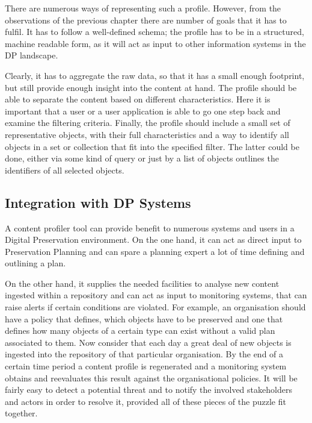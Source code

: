 There are numerous ways of representing such a profile. However, from the observations of the previous chapter there are number of goals that it has to fulfil. It has to follow a well-defined schema; the profile has to be in a structured, machine readable form, as it will act as input to other information systems in the DP landscape.

Clearly, it has to aggregate the raw data, so that it has a small enough footprint, but still provide enough insight into the content at hand. The profile should be able to separate the content based on different characteristics. Here it is important that a user or a user application is able to go one step back and examine the filtering criteria. Finally, the profile should include a small set of representative objects, with their full characteristics and a way to identify all objects in a set or collection that fit into the specified filter. The latter could be done, either via some kind of query or just by a list of objects outlines the identifiers of all selected objects.


\subsection{Integration with DP Systems}
A content profiler tool can provide benefit to numerous systems and users in a Digital Preservation environment. On the one hand, it can act as direct input to Preservation Planning and can spare a planning expert a lot of time defining and outlining a plan. 

On the other hand, it supplies the needed facilities to analyse new content ingested within a repository and can act as input to monitoring systems, that can raise alerts if certain conditions are violated. For example, an organisation should have a policy that defines, which objects have to be preserved and one that defines how many objects of a certain type can exist without a valid plan associated to them. Now consider that each day a great deal of new objects is ingested into the repository of that particular organisation. By the end of a certain time period a content profile is regenerated and a monitoring system obtains and reevaluates this result against the organisational policies. It will be fairly easy to detect a potential threat and to notify the involved stakeholders and actors in order to resolve it, provided all of these pieces of the puzzle fit together.

